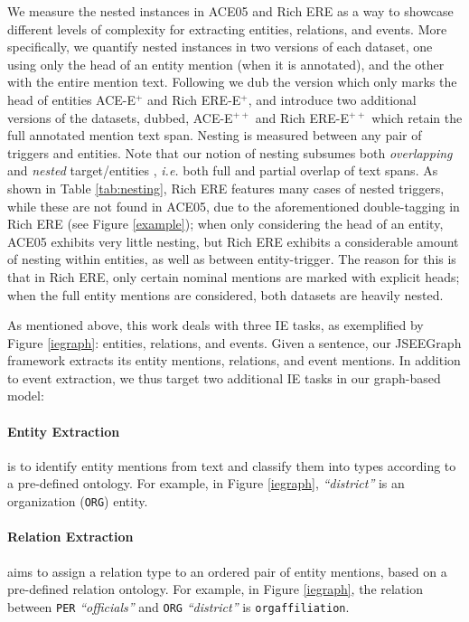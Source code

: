 \documentclass[11pt]{article}
\begin{document}
We measure the nested instances in ACE05 and Rich ERE as a way to showcase different levels of complexity for extracting entities, relations, and events. More specifically, we quantify nested instances in two versions of each dataset, one using only the head of an entity mention (when it is annotated), and the other with the entire mention text. Following \citet{lin-etal-2020-joint} we dub the version which only marks the head of entities ACE-E${^+}$ and Rich ERE-E${^+}$, and introduce two additional versions of the datasets, dubbed, ACE-E${^{++}}$ and Rich ERE-E${^{++}}$ which retain the full annotated mention text span. Nesting is measured between any pair of triggers and entities. Note that our notion of nesting subsumes both \textit{overlapping} and \textit{nested} target/entities \citep{cao-etal-2022-oneee}, \textit{i.e.} both full and partial overlap of text spans.  As shown in Table \ref{tab:nesting}, Rich ERE features many cases of nested triggers, while these are not found in ACE05, due to the aforementioned double-tagging in Rich ERE (see Figure \ref{example}); when only considering the head of an entity, ACE05 exhibits very little nesting, but Rich ERE exhibits a considerable amount of nesting within entities, as well as between entity-trigger. The reason for this is that in Rich ERE, only certain nominal mentions are marked with explicit heads; when the full entity mentions are considered, both datasets are heavily nested.

As mentioned above, this work deals with three IE tasks, as exemplified by Figure \ref{iegraph}: entities, relations, and events. Given a sentence, our JSEEGraph framework extracts its entity mentions, relations, and event mentions. In addition to event extraction, we thus target two additional IE tasks in our graph-based model:

\paragraph{Entity Extraction} is to identify entity mentions from text and classify them into types according to a pre-defined ontology. For example, in Figure \ref{iegraph}, \textit{``district''} is an organization (\texttt{ORG}) entity.

\paragraph{Relation Extraction} aims to assign a relation type to an ordered pair of entity mentions, based on a pre-defined relation ontology. For example, in Figure \ref{iegraph}, the relation between \texttt{PER} \textit{``officials''} and \texttt{ORG} \textit{``district''} is \texttt{orgaffiliation}.
\end{document}
